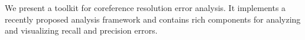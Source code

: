 We present a toolkit for coreference resolution error analysis. It implements a recently proposed analysis framework and contains rich components for analyzing and visualizing recall and precision errors.
